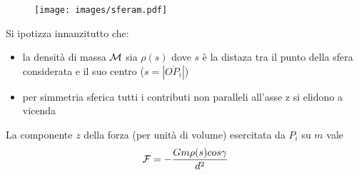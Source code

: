 \documentclass[Main.tex]{subfiles}
\begin{document}
\begin{wrapfigure}{l}{0.35\textwidth}
	\texttt{[image: images/sferam.pdf]}
\end{wrapfigure}
\noindent Si ipotizza innanzitutto che:
\begin{itemize}
	\item la densità di massa $\mathcal{M}$ sia $\rho(s)$ dove $s$ è la distaza tra il punto della sfera considerata e il suo centro ($s=|\overline{OP_i}|$)
	\item per simmetria sferica tutti i contributi non paralleli all'asse z si elidono a vicenda
\end{itemize}
La componente $z$ della forza (per unità di volume) esercitata da $P_i$ su $m$ vale 
\begin{equation}
	\mathcal{F} = - \frac{Gm \rho(s) cos \gamma}{d^2}
\end{equation}
\newline \ \newline 
\end{document}
